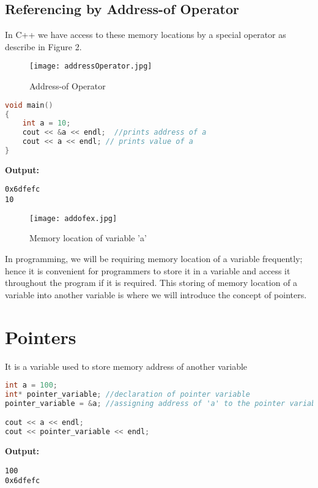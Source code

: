 \documentclass[11pt,fleqn]{book} %
\begin{document}
\subsection{Referencing by Address-of Operator}
In C++ we have access to these memory locations by a special operator as describe in Figure 2.

\begin{figure}[h]
	\centering\texttt{[image: addressOperator.jpg]}
	\caption{Address-of Operator}
\end{figure}

\begin{lstlisting}[language=C++, caption = Address of a variable]
void main()
{
	int a = 10;
	cout << &a << endl;  //prints address of a
	cout << a << endl; // prints value of a 
}
\end{lstlisting}
\textbf{Output:}
\begin{lstlisting}
0x6dfefc 
10
\end{lstlisting}

\begin{figure}[h]
	\centering\texttt{[image: addofex.jpg]}
	\caption{Memory location of variable 'a'}
\end{figure} 
In programming, we will be requiring memory location of a variable frequently; hence it is convenient for programmers to store it in a variable and access it throughout the program if it is required. This storing of memory location of a variable into another variable is where we will introduce the concept of pointers. 
\section{Pointers}
\begin{definition}[Pointer] It is a variable used to store memory address of another variable
\end{definition}
\begin{lstlisting}[language=C++, caption = Pointer variable]
int a = 100;
int* pointer_variable; //declaration of pointer variable
pointer_variable = &a; //assigning address of 'a' to the pointer variable

cout << a << endl;
cout << pointer_variable << endl;

\end{lstlisting}
\textbf{Output:} 
\begin{lstlisting}
100
0x6dfefc
\end{lstlisting}
\end{document}
